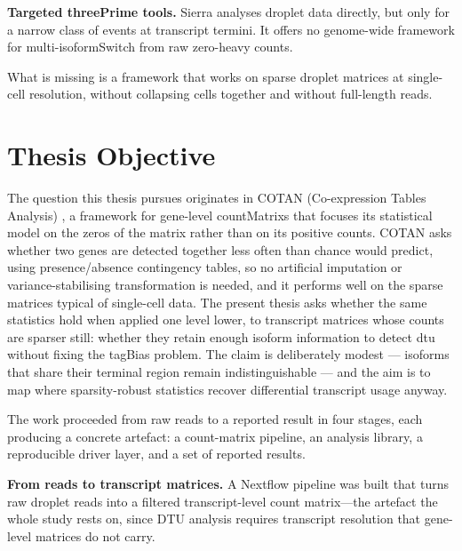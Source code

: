 \textbf{Targeted \gls{threePrime} tools.} Sierra \cite{patrick2020sierra} analyses droplet data directly, but only for a narrow class of events at transcript termini. It offers no genome-wide framework for multi-\gls{isoformSwitch} from raw zero-heavy counts.

What is missing is a framework that works on sparse droplet matrices at single-cell resolution, without collapsing cells together and without full-length reads.

\section{Thesis Objective}

The question this thesis pursues originates in COTAN (Co-expression Tables Analysis) \cite{galfre2021cotan}, a framework for gene-level \glspl{countMatrix} that focuses its statistical model on the zeros of the matrix rather than on its positive counts. COTAN asks whether two genes are detected together less often than chance would predict, using presence/absence contingency tables, so no artificial imputation or variance-stabilising transformation is needed, and it performs well on the sparse matrices typical of single-cell data. The present thesis asks whether the same statistics hold when applied one level lower, to \gls{transcript} matrices whose counts are sparser still: whether they retain enough \gls{isoform} information to detect \gls{dtu} without fixing the \gls{tagBias} problem. The claim is deliberately modest --- isoforms that share their terminal region remain indistinguishable --- and the aim is to map where sparsity-robust statistics recover differential transcript usage anyway.

The work proceeded from raw reads to a reported result in four stages, each producing a concrete artefact: a count-matrix pipeline, an analysis library, a reproducible driver layer, and a set of reported results.

\textbf{From reads to transcript matrices.} A Nextflow pipeline was built that turns raw droplet reads into a filtered transcript-level count matrix---the artefact the whole study rests on, since DTU analysis requires transcript resolution that gene-level matrices do not carry.

